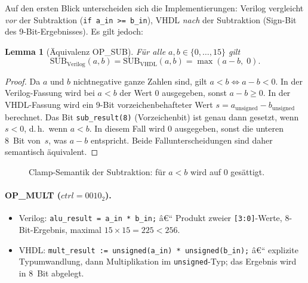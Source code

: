 ﻿\documentclass[12pt,a4paper]{report}
\newtheorem{lemma}[theorem]{Lemma}
\begin{document}
Auf den ersten Blick unterscheiden sich die Implementierungen: Verilog vergleicht
\emph{vor} der Subtraktion (\texttt{if a\_in >= b\_in}), VHDL \emph{nach} der
Subtraktion (Sign-Bit des 9-Bit-Ergebnisses).  Es gilt jedoch:

\begin{lemma}[Äquivalenz OP\_SUB]
	\label{lem:sub_equiv}
	Für alle $a, b \in \{0,\ldots,15\}$ gilt
	\[
	\mathrm{SUB}_\mathrm{Verilog}(a,b)
	= \mathrm{SUB}_\mathrm{VHDL}(a,b)
	= \max(a - b,\; 0).
	\]
\end{lemma}
\begin{proof}
	Da $a$ und $b$ nichtnegative ganze Zahlen sind, gilt $a < b
	\Leftrightarrow a - b < 0$.  In der Verilog-Fassung wird bei $a < b$ der Wert
	0 ausgegeben, sonst $a - b \geq 0$.  In der VHDL-Fassung wird ein 9-Bit vorzeichenbehafteter
	Wert $s = a_\mathrm{unsigned} - b_\mathrm{unsigned}$ berechnet.  Das Bit
	\texttt{sub\_result(8)} (Vorzeichenbit) ist genau dann gesetzt, wenn
	$s < 0$, d.\,h.\ wenn $a < b$.  In diesem Fall wird 0 ausgegeben, sonst die
	unteren 8~Bit von~$s$, was $a - b$ entspricht.  Beide Fallunterscheidungen
	sind daher semantisch äquivalent.
\end{proof}

\begin{figure}[H]
	\centering
	\caption{Clamp-Semantik der Subtraktion: für $a < b$ wird auf 0 gesättigt.}
\end{figure}

\paragraph{OP\_MULT ($ctrl = 0010_2$).}
\begin{itemize}
	\item Verilog: \texttt{alu\_result = a\_in * b\_in;} â€“
	Produkt zweier \texttt{[3:0]}-Werte, 8-Bit-Ergebnis, maximal $15 \times 15 = 225 < 256$.
	\item VHDL: \texttt{mult\_result := unsigned(a\_in) * unsigned(b\_in);} â€“
	explizite Typumwandlung, dann Multiplikation im \texttt{unsigned}-Typ;
	das Ergebnis wird in 8~Bit abgelegt.
\end{itemize}
\end{document}

